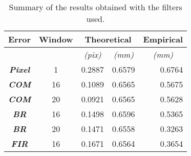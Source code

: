 \begin{table}[t!]
\centering
\begin{tabular}{|c|c|r|r|r|}
\hline
\textbf{\textbf{Error}}  & \multicolumn{1}{l|}{\textbf{Window}} & \multicolumn{2}{c|}{\textbf{Theoretical}}                                & \multicolumn{1}{c|}{\textbf{Empirical}} \\ \hline
\textit{}                   & \textit{}                            & \multicolumn{1}{c|}{\textit{(pix)}}       & \multicolumn{1}{c|}{\textit{(mm)}}        & \multicolumn{1}{c|}{\textit{(mm)}}      \\ \hline
\textit{\textbf{Pixel}} & 1                                    & 0.2887                                    & 0.6579                                    & 0.6764                                  \\ \hline
\textit{\textbf{COM}}   & 16                                   & 0.1089                                    & 0.6565                                    & 0.5675                                  \\ \hline
\textit{\textbf{COM}}   & 20                                   & 0.0921                                    & 0.6565                                    & 0.5628                                  \\ \hline
\textit{\textbf{BR}}    & 16                                   & 0.1498                                    & 0.6596                                    & 0.5365                                  \\ \hline
\textit{\textbf{BR}}    & 20                                   & 0.1471                                    & 0.6558                                    & 0.3263                                  \\ \hline
\textit{\textbf{FIR}}   & 16                                   & 0.1671                                    & 0.6564                                    & 0.3654                                  \\ \hline
\end{tabular}
\caption{Summary of the results obtained with the filters used.}
\label{tab:c5-r1-all}
\end{table}
